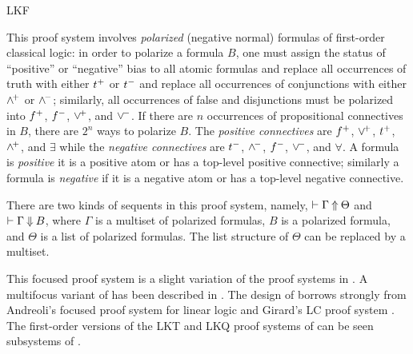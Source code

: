\begin{entry}{LKF}
\begin{clarifications}
This proof system involves \emph{polarized} (negative normal) formulas
of first-order classical logic: in order to polarize a formula $B$,
one must assign the status of ``positive'' or ``negative'' bias to all
atomic formulas and replace all occurrences of truth with either
$t^+$ or $t^-$ and replace all occurrences of conjunctions with
either $\wedge^{\!+}$ or $\wedge^{\!-}$; similarly, all occurrences of false and
disjunctions must be polarized into $f^+$, $f^-$, $\vee^{\!+}$, and
$\vee^{\!-}$. If there are $n$ occurrences of propositional connectives
in $B$, there are $2^n$ ways to polarize $B$.
The \emph{positive connectives} are $f^+$, $\vee^{\!+}$, $t^+$,
$\wedge^{\!+}$, and $\exists$ while the \emph{negative connectives} are
$t^-$, $\wedge^{\!-}$, $f^-$, $\vee^{\!-}$, and $\forall$.
A formula is \emph{positive} it is a positive atom or has a top-level
positive connective; similarly a formula is \emph{negative} if it is a
negative atom or has a top-level negative connective.

There are two kinds of sequents in this proof system, namely,
$\vdash\Gamma\mathbin{\Uparrow} \Theta$ and $\vdash\Gamma\mathbin{\Downarrow} B$, where $\Gamma$ is a
multiset of polarized formulas, $B$ is a polarized formula, and
$\Theta$ is a list of polarized formulas.  The list structure of
$\Theta$ can be replaced by a multiset.
\end{clarifications}

\begin{history}
This focused proof system is a slight variation of the proof systems in
\cite{liang09tcs,liang07csl}.  
A multifocus variant of \LKF has been described in \cite{chaudhuri14jlc}.
The design of \LKF borrows strongly from Andreoli's focused proof system for
linear logic \cite{andreoli92jlc} and Girard's LC proof
system \cite{girard91mscs}.  The first-order versions 
of the LKT and LKQ proof systems of \cite{danos93wll} can be seen 
subsystems of \LKF.
\end{history}

\end{entry}
